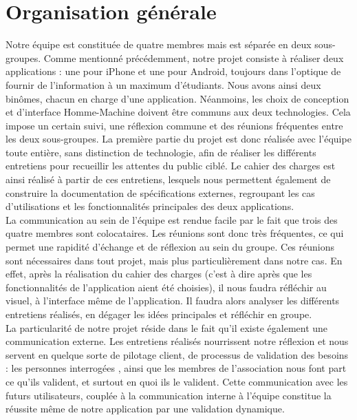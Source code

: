 \documentclass[a4paper,11px]{article}
\begin{document}
\section{\bf{Organisation générale}}
\indent Notre équipe est constituée de quatre membres mais est séparée en deux sous-groupes. Comme mentionné précédemment, notre projet consiste à réaliser deux applications : une pour iPhone et une pour Android, toujours dans l'optique de fournir de l'information à un maximum d'étudiants. Nous avons ainsi deux binômes, chacun en charge d'une application. Néanmoins, les choix de conception et d'interface Homme-Machine doivent être communs aux deux technologies. Cela impose un certain suivi, une réflexion commune et des réunions fréquentes entre les deux sous-groupes. La première partie du projet est donc réalisée avec l'équipe toute entière, sans distinction de technologie, afin de réaliser les différents entretiens pour recueillir les attentes du public ciblé. Le cahier des charges est ainsi réalisé à partir de ces entretiens, lesquels nous permettent également de construire la documentation de spécifications externes, regroupant les cas d'utilisations et les fonctionnalités principales des deux applications.\\
\indent La communication au sein de l'équipe est rendue facile par le fait que trois des quatre membres sont colocataires. Les réunions sont donc très fréquentes, ce qui permet une rapidité d'échange et de réflexion au sein du groupe. Ces réunions sont nécessaires dans tout projet, mais plus particulièrement dans notre cas. En effet, après la réalisation du cahier des charges (c'est à dire après que les fonctionnalités de l'application aient été choisies), il nous faudra réfléchir au visuel, à l'interface même de l'application. Il faudra alors analyser les différents entretiens réalisés, en dégager les idées principales et réfléchir en groupe.\\
\indent La particularité de notre projet réside dans le fait qu'il existe également une communication externe. Les entretiens réalisés nourrissent notre réflexion et nous servent en quelque sorte de pilotage client, de processus de validation des besoins : les personnes interrogées , ainsi que les membres de l'association nous font part ce qu'ils valident, et surtout en quoi ils le valident. Cette communication avec les futurs utilisateurs, couplée à la communication interne à l'équipe constitue la réussite même de notre application par une validation dynamique.\\
\\
\end{document}
